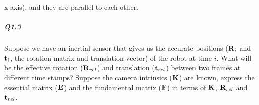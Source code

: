 \begin{your_solution}[title=Q1.2,height=6cm,width=\linewidth]
x-axis), and they are parallel to each other.



\end{your_solution}

\subparagraph*{Q1.3}
Suppose we have an inertial sensor that gives us the accurate positions (${\bf R}_i$ and ${\bf t}_i$, the rotation matrix and translation vector) of the robot at time $i$. What will be the effective rotation (${\bf R}_{rel}$) and translation (${\bf t}_{rel}$) between two frames at different time stamps? Suppose the camera intrinsics (${\bf K}$) are known, express the essential matrix (${\bf E}$) and the fundamental matrix (${\bf F}$) in terms of ${\bf K}$, ${\bf R}_{rel}$ and ${\bf t}_{rel}$.

